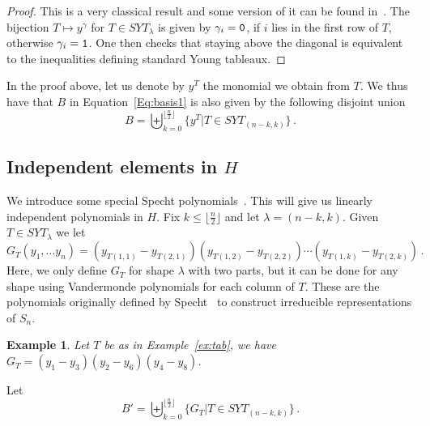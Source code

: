 \documentclass[10pt,a4paper]{article}
\newtheorem{example}{Example}[section]
\begin{document}
\begin{proof}
This is a very classical result and some version of it can be found in~\cite{Stanley}. The bijection $T\mapsto y^\gamma$ for $T\in SYT_\lambda$ is  given by $\gamma_i=\textnormal{\texttt{0}}$, if $i$ lies in the first row of $T$, otherwise $\gamma_i=\textnormal{\texttt{1}}$. One then checks that staying above the diagonal is equivalent to the inequalities defining standard  Young tableaux.
\end{proof}

In the proof above, let us denote by  $y^T$ the monomial we obtain from $T$. We thus have that $B$ in  Equation~\eqref{Eq:basis1} is also given by the following disjoint union
\begin{equation}\label{Eq:BinT}
	B=\biguplus_{k=0}^{ \lfloor \frac{n}{2} \rfloor} \big\{ y^T \big| T \in SYT_{(n-k,k)}\big\}\,.
\end{equation}


\subsection{Independent elements in $H$}\label{ss:specht}
We introduce some special Specht polynomials~\cite{Specht}. This will give us linearly independent polynomials in $H$.
Fix $k\le \lfloor \frac{n}{2} \rfloor$ and let $\lambda=(n-k,k)$. Given $T\in SYT_\lambda$ we let
\begin{equation}\label{eq:Gpoly}
 G_T(y_1,\ldots y_n) = (y_{T(1,1)} - y_{T(2,1)})  (y_{T(1,2)} - y_{T(2,2)}) \cdots  (y_{T(1,k)} - y_{T(2,k)}) \,.
 \end{equation}
  Here, we only define $G_T$ for shape $\lambda$ with two parts, but it can be done for any shape using Vandermonde polynomials for each column of $T$. 
  These are  the polynomials originally  defined by Specht~\cite{Specht} to construct irreducible representations of $S_n$.
\begin{example}
  Let $T$ be as in Example~\ref{ex:tab}, we have $G_T=(y_1-y_3)(y_2-y_6)(y_4-y_8)$.
\end{example}
Let
\begin{equation}\label{Eq:B2inT}
	B'=\biguplus_{k=0}^{ \lfloor \frac{n}{2} \rfloor} \big\{ G_T \big| T \in SYT_{(n-k,k)}\big\}\,.
\end{equation}
\end{document}
